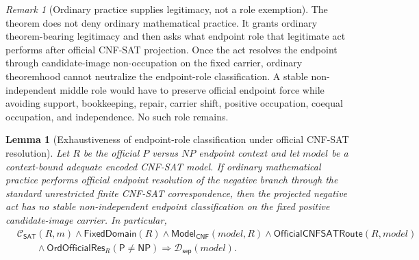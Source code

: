 \documentclass[11pt]{article}
\newtheorem{lemma}[theorem]{Lemma}
\theoremstyle{definition}
\theoremstyle{remark}
\newtheorem{remark}[theorem]{Remark}
\newcommand{\Pclass}{\mathsf{P}}
\newcommand{\NPclass}{\mathsf{NP}}
\newcommand{\ClayCtx}{\mathcal{C}_{\mathsf{SAT}}(R,m)}
\newcommand{\FixedDom}{\mathsf{FixedDomain}}
\newcommand{\SepDisc}{\mathcal{D}_{\mathsf{sep}}}
\newcommand{\ModelOfCnf}{\mathsf{Model}_{\mathsf{CNF}}}
\newcommand{\OrdOfficialRes}{\mathsf{OrdOfficialRes}}
\newcommand{\OfficialCNFSATRoute}{\mathsf{OfficialCNFSATRoute}}
\begin{document}
\begin{remark}[Ordinary practice supplies legitimacy, not a role exemption]
The theorem does not deny ordinary mathematical practice. It grants ordinary theorem-bearing legitimacy and then asks what endpoint role that legitimate act performs after official CNF-SAT projection. Once the act resolves the endpoint through candidate-image non-occupation on the fixed carrier, ordinary theoremhood cannot neutralize the endpoint-role classification. A stable non-independent middle role would have to preserve official endpoint force while avoiding support, bookkeeping, repair, carrier shift, positive occupation, coequal occupation, and independence. No such role remains.
\end{remark}


\begin{lemma}[Exhaustiveness of endpoint-role classification under official CNF-SAT resolution]
\label{lem:official-cnf-sat-resolution-exhaustiveness}
Let \(R\) be the official \(P\) versus \(NP\) endpoint context and let \(model\) be a context-bound adequate encoded CNF-SAT model. If ordinary mathematical practice performs official endpoint resolution of the negative branch through the standard unrestricted finite CNF-SAT correspondence, then the projected negative act has no stable non-independent endpoint classification on the fixed positive candidate-image carrier. In particular,
\[
\begin{aligned}
  &\ClayCtx\wedge\FixedDom(R)\wedge\ModelOfCnf(model,R)
  \wedge\OfficialCNFSATRoute(R,model)\\
  &\qquad\wedge\OrdOfficialRes_R(\Pclass\neq\NPclass)
  \Rightarrow \SepDisc(model).
\end{aligned}
\]
\end{lemma}
\end{document}
